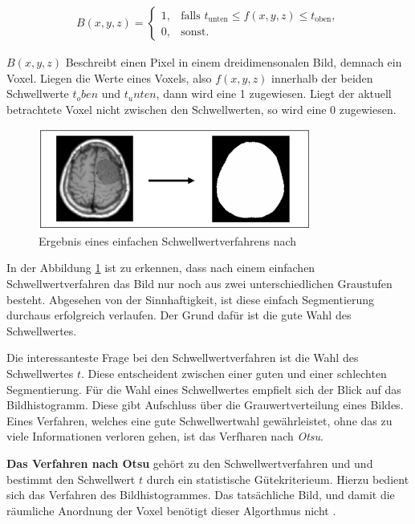 \begin{align}
	\label{equ:schwellwertverfahren}B(x, y, z) = \begin{cases}1,&\text{falls }t_{\text{unten}}\leq f(x, y, z) \leq t_{\text{oben}}, \\ 0,&\text{sonst}.\end{cases}
\end{align}

$B(x, y, z)$ Beschreibt einen Pixel in einem dreidimensonalen Bild, demnach ein
Voxel. Liegen die Werte eines Voxels, also $f(x, y, z)$ innerhalb der beiden
Schwellwerte $t_{o}ben$ und $t_{u}nten$, dann wird eine 1 zugewiesen. Liegt der
aktuell betrachtete Voxel nicht zwischen den Schwellwerten, so wird eine 0 zugewiesen.

\begin{figure}[h]
	\centering
	\includegraphics[width=0.8\textwidth]{img/beispiel_schwellwertverfahren.jpg}
	\caption{Ergebnis eines einfachen Schwellwertverfahrens nach \citet[Seite 96]{handels2000}}
	\label{fig:binäres_schwellwertverfahren}
\end{figure}

In der Abbildung \ref{fig:binäres_schwellwertverfahren} ist zu erkennen, dass nach
einem einfachen Schwellwertverfahren das Bild nur noch aus zwei unterschiedlichen
Graustufen besteht. Abgesehen von der Sinnhaftigkeit, ist diese einfach Segmentierung
durchaus erfolgreich verlaufen. Der Grund dafür ist die gute Wahl des
Schwellwertes.

Die interessanteste Frage bei den Schwellwertverfahren ist die Wahl des
Schwellwertes $t$. Diese entscheident zwischen einer guten und einer schlechten Segmentierung.
Für die Wahl eines Schwellwertes empfielt sich der Blick auf das Bildhistogramm.
Diese gibt Aufschluss über die Grauwertverteilung eines Bildes\citep[vgl.][Seite
361]{lehmann2013bildverarbeitung}. Eines Verfahren, welches eine gute
Schwellwertwahl gewährleistet, ohne das zu viele Informationen verloren gehen,
ist das Verfharen nach \textit{Otsu}.

\textbf{Das Verfahren nach Otsu} gehört zu den Schwellwertverfahren und und
bestimmt den Schwellwert $t$ durch ein statistische Gütekriterieum. Hierzu bedient
sich das Verfahren des Bildhistogrammes. Das tatsächliche Bild, und damit die räumliche
Anordnung der Voxel benötigt dieser Algorthmus nicht \citep[vgl.][Seite 264]{lehmann2013bildverarbeitung}.

